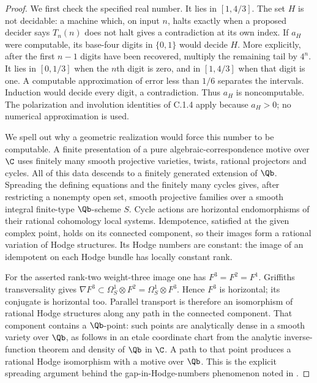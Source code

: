 \begin{proof}
We first check the specified real number. It lies in $[1,4/3]$. The set $H$ is not decidable: a machine which, on input $n$, halts exactly when a proposed decider says $T_n(n)$ does not halt gives a contradiction at its own index. If $a_H$ were computable, its base-four digits in $\{0,1\}$ would decide $H$. More explicitly, after the first $n-1$ digits have been recovered, multiply the remaining tail by $4^n$. It lies in $[0,1/3]$ when the $n$th digit is zero, and in $[1,4/3]$ when that digit is one. A computable approximation of error less than $1/6$ separates the intervals. Induction would decide every digit, a contradiction. Thus $a_H$ is noncomputable. The polarization and involution identities of C.1.4 apply because $a_H>0$; no numerical approximation is used.

We spell out why a geometric realization would force this number to be computable. A finite presentation of a pure algebraic-correspondence motive over $\C$ uses finitely many smooth projective varieties, twists, rational projectors and cycles. All of this data descends to a finitely generated extension of $\Qb$. Spreading the defining equations and the finitely many cycles gives, after restricting a nonempty open set, smooth projective families over a smooth integral finite-type $\Qb$-scheme $S$. Cycle actions are horizontal endomorphisms of their rational cohomology local systems. Idempotence, satisfied at the given complex point, holds on its connected component, so their images form a rational variation of Hodge structures. Its Hodge numbers are constant: the image of an idempotent on each Hodge bundle has locally constant rank.

For the asserted rank-two weight-three image one has $F^3=F^2=F^1$. Griffiths transversality gives $\nabla F^3\subset\Omega_S^1\otimes F^2=\Omega_S^1\otimes F^3$. Hence $F^3$ is horizontal; its conjugate is horizontal too. Parallel transport is therefore an isomorphism of rational Hodge structures along any path in the connected component. That component contains a $\Qb$-point: such points are analytically dense in a smooth variety over $\Qb$, as follows in an etale coordinate chart from the analytic inverse-function theorem and density of $\Qb$ in $\C$. A path to that point produces a rational Hodge isomorphism with a motive over $\Qb$. This is the explicit spreading argument behind the gap-in-Hodge-numbers phenomenon noted in \cite[Introduction, pp.~1--2]{TotaroHodge2015}.


\end{proof}
